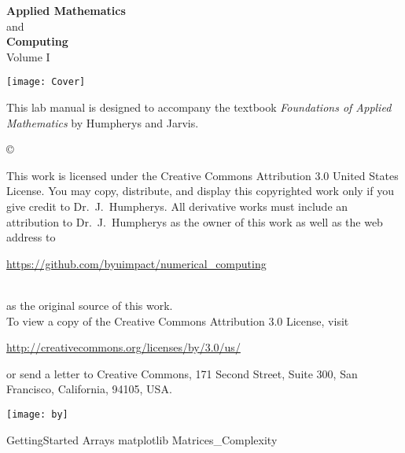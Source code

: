 \documentclass[nociteref]{SIAM-GH-book}
\begin{document}



\thispagestyle{empty}
\begin{center}
{\huge \bf Applied Mathematics} \\ and \\ {\huge \bf Computing} \\
\vspace{5mm}
{\Large Volume I}
\vspace{20mm}

\texttt{[image: Cover]}
\end{center}
\frontmatter




\begin{thepreface}
This lab manual is designed to accompany the textbook \emph{Foundations of Applied Mathematics} by Humpherys and Jarvis.

\vfill
\copyright{This work is licensed under the Creative Commons Attribution 3.0 United States
License.  You may copy, distribute, and display this copyrighted work only if you give
credit to Dr.~J.~Humpherys. All derivative works must include an attribution to Dr.~J.~Humpherys as the owner of this work as well as the web address to
\\\centerline{\url{https://github.com/byuimpact/numerical_computing}}\\ as the original source of
this
work.\\To view a copy of the Creative Commons Attribution 3.0 License,
visit\\\centerline{\url{http://creativecommons.org/licenses/by/3.0/us/}} or send a letter to
Creative Commons, 171 Second Street, Suite 300, San Francisco, California, 94105, USA.}

\vfill
\centering\texttt{[image: by]}
\vfill
\end{thepreface}

\setcounter{tocdepth}{1}
\tableofcontents

\mainmatter
{GettingStarted}
{Arrays}
{matplotlib}
{Matrices_Complexity}
\end{document}
